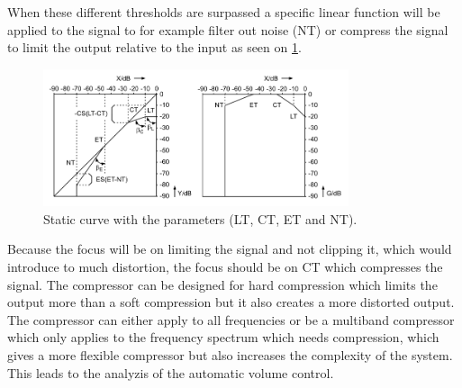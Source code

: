 When these different thresholds are surpassed a specific linear function will be applied to the signal to for example filter out noise (NT) or compress the signal to limit the output relative to the input as seen on \ref{fig:limiter_static}. 

\begin{figure}[H]
\centering
\includegraphics[width=0.8\textwidth]{figures/limiter_static_curve.png}
\caption{Static curve with the parameters (LT, CT, ET and NT).}
\label{fig:limiter_static}
\end{figure}  

Because the focus will be on limiting the signal and not clipping it, which would introduce to much distortion, the focus should be on CT which compresses the signal. The compressor can be designed for hard compression which limits the output more than a soft compression but it also creates a more distorted output. The compressor can either apply to all frequencies or be a multiband compressor which only applies to the frequency spectrum which needs compression, which gives a more flexible compressor but also increases the complexity of the system. This leads to the analyzis of the automatic volume control.    

      